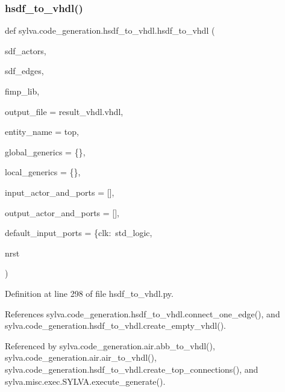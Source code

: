 \subsubsection{\texorpdfstring{hsdf\+\_\+to\+\_\+vhdl()}{hsdf\_to\_vhdl()}}
{\footnotesize\ttfamily def sylva.\+code\+\_\+generation.\+hsdf\+\_\+to\+\_\+vhdl.\+hsdf\+\_\+to\+\_\+vhdl (\begin{DoxyParamCaption}\item[{}]{sdf\+\_\+actors,  }\item[{}]{sdf\+\_\+edges,  }\item[{}]{fimp\+\_\+lib,  }\item[{}]{output\+\_\+file = {\ttfamily \textquotesingle{}result\+\_\+vhdl.vhdl\textquotesingle{}},  }\item[{}]{entity\+\_\+name = {\ttfamily \textquotesingle{}top\textquotesingle{}},  }\item[{}]{global\+\_\+generics = {\ttfamily \{\}},  }\item[{}]{local\+\_\+generics = {\ttfamily \{\}},  }\item[{}]{input\+\_\+actor\+\_\+and\+\_\+ports = {\ttfamily \mbox{[}\mbox{]}},  }\item[{}]{output\+\_\+actor\+\_\+and\+\_\+ports = {\ttfamily \mbox{[}\mbox{]}},  }\item[{}]{default\+\_\+input\+\_\+ports = {\ttfamily \{\textquotesingle{}clk\textquotesingle{}\+:~\textquotesingle{}std\+\_\+logic\textquotesingle{}},  }\item[{}]{nrst }\end{DoxyParamCaption})}



Definition at line 298 of file hsdf\+\_\+to\+\_\+vhdl.\+py.



References sylva.\+code\+\_\+generation.\+hsdf\+\_\+to\+\_\+vhdl.\+connect\+\_\+one\+\_\+edge(), and sylva.\+code\+\_\+generation.\+hsdf\+\_\+to\+\_\+vhdl.\+create\+\_\+empty\+\_\+vhdl().



Referenced by sylva.\+code\+\_\+generation.\+air.\+abb\+\_\+to\+\_\+vhdl(), sylva.\+code\+\_\+generation.\+air.\+air\+\_\+to\+\_\+vhdl(), sylva.\+code\+\_\+generation.\+hsdf\+\_\+to\+\_\+vhdl.\+create\+\_\+top\+\_\+connections(), and sylva.\+misc.\+exec.\+S\+Y\+L\+V\+A.\+execute\+\_\+generate().


